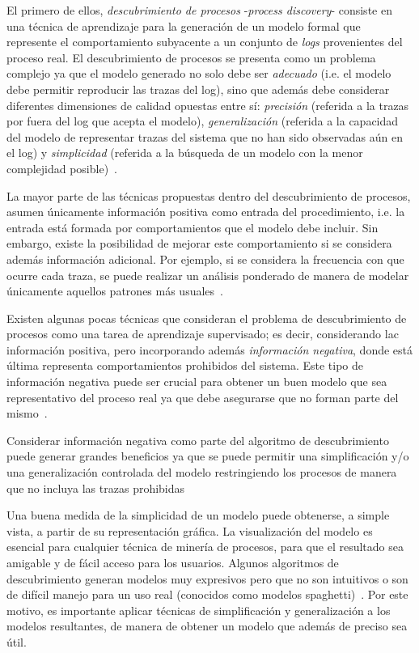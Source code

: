 El primero de ellos, \textit{descubrimiento de procesos} -\textit{process discovery}- consiste
en una técnica de aprendizaje para la generación de un modelo formal que represente el comportamiento
subyacente a un conjunto de \textit{logs} provenientes del proceso real.
El descubrimiento de procesos se presenta como un problema complejo ya que el modelo generado
no solo debe ser \emph{adecuado} (i.e. el modelo debe permitir reproducir las trazas del log),
sino que además debe considerar diferentes dimensiones de calidad opuestas entre sí:
\emph{precisión} (referida a la trazas por fuera del log que acepta el modelo),
\emph{generalización} (referida a la capacidad del modelo de representar trazas del sistema que no han sido observadas aún en el log) y
\emph{simplicidad} (referida a la búsqueda de un modelo con la menor complejidad posible)~\cite{BuijsvDBAalst,Aalst2012}.

La mayor parte de las técnicas propuestas dentro del descubrimiento de procesos, asumen únicamente información
positiva como entrada del procedimiento, i.e. la entrada está formada por comportamientos que el modelo debe 
incluir. Sin embargo, existe la posibilidad de mejorar este comportamiento si se considera además información 
adicional. Por ejemplo, si se considera la frecuencia con que ocurre cada traza, se puede realizar un análisis
ponderado de manera de modelar únicamente aquellos patrones más usuales~\cite{GuntherA07,WeijtersR11,LeemansFA13}.

Existen algunas pocas técnicas que consideran el problema de descubrimiento de procesos como una tarea de
aprendizaje supervisado; es decir, considerando lac información positiva, pero incorporando además \emph{información negativa},
donde está última representa comportamientos prohibidos del sistema. Este tipo de información negativa puede ser crucial para 
obtener un buen modelo que sea representativo del proceso real ya que debe asegurarse que no forman
parte del mismo~\cite{Ferreira2006,Lamma2007,Lamma2008,alberti2008verifiable,Goedertier2009}.

Considerar información negativa como parte del algoritmo de descubrimiento puede generar grandes beneficios ya que
se puede permitir una simplificación y/o una generalización controlada del modelo restringiendo los procesos de 
manera que no incluya las trazas prohibidas


Una buena medida de la simplicidad de un modelo puede obtenerse, a simple vista, a partir de su representación gráfica.
La visualización del modelo es esencial para cualquier técnica de minería de procesos, para que el resultado sea amigable
y de fácil acceso para los usuarios. Algunos algoritmos de descubrimiento generan modelos muy expresivos
pero que no son intuitivos o son de difícil manejo para un uso real (conocidos como modelos spaghetti)~\cite{AalstSP11}. 
Por este motivo, es importante aplicar técnicas de simplificación y generalización a los modelos resultantes,
de manera de obtener un modelo que además de preciso sea útil.

